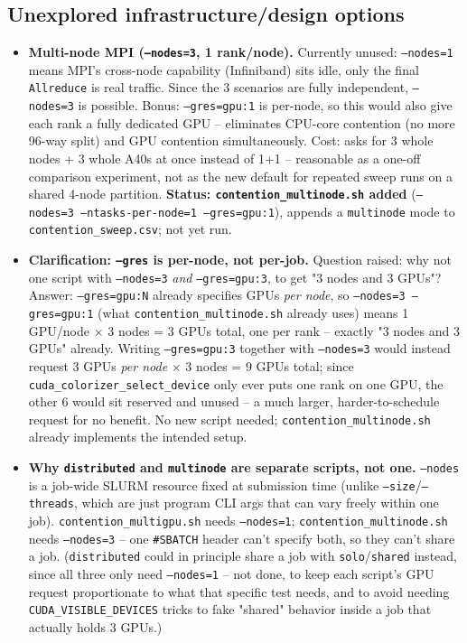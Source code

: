 \subsection{Unexplored infrastructure/design options}
\begin{itemize}
\item \textbf{Multi-node MPI (\texttt{--nodes=3}, 1 rank/node).} Currently unused: \texttt{--nodes=1} means MPI's cross-node capability (Infiniband) sits idle, only the final \texttt{Allreduce} is real traffic. Since the 3 scenarios are fully independent, \texttt{--nodes=3} is possible. Bonus: \texttt{--gres=gpu:1} is per-node, so this would also give each rank a fully dedicated GPU -- eliminates CPU-core contention (no more 96-way split) and GPU contention simultaneously. Cost: asks for 3 whole nodes + 3 whole A40s at once instead of 1+1 -- reasonable as a one-off comparison experiment, not as the new default for repeated sweep runs on a shared 4-node partition. \textbf{Status: \texttt{contention\_multinode.sh} added} (\texttt{--nodes=3 --ntasks-per-node=1 --gres=gpu:1}), appends a \texttt{multinode} mode to \texttt{contention\_sweep.csv}; not yet run.
\item \textbf{Clarification: \texttt{--gres} is per-node, not per-job.} Question raised: why not one script with \texttt{--nodes=3} \emph{and} \texttt{--gres=gpu:3}, to get "3 nodes and 3 GPUs"? Answer: \texttt{--gres=gpu:N} already specifies GPUs \emph{per node}, so \texttt{--nodes=3 --gres=gpu:1} (what \texttt{contention\_multinode.sh} already uses) means 1 GPU/node $\times$ 3 nodes = 3 GPUs total, one per rank -- exactly "3 nodes and 3 GPUs" already. Writing \texttt{--gres=gpu:3} together with \texttt{--nodes=3} would instead request 3 GPUs \emph{per node} $\times$ 3 nodes = 9 GPUs total; since \texttt{cuda\_colorizer\_select\_device} only ever puts one rank on one GPU, the other 6 would sit reserved and unused -- a much larger, harder-to-schedule request for no benefit. No new script needed; \texttt{contention\_multinode.sh} already implements the intended setup.
\item \textbf{Why \texttt{distributed} and \texttt{multinode} are separate scripts, not one.} \texttt{--nodes} is a job-wide SLURM resource fixed at submission time (unlike \texttt{--size}/\texttt{--threads}, which are just program CLI args that can vary freely within one job). \texttt{contention\_multigpu.sh} needs \texttt{--nodes=1}; \texttt{contention\_multinode.sh} needs \texttt{--nodes=3} -- one \texttt{\#SBATCH} header can't specify both, so they can't share a job. (\texttt{distributed} could in principle share a job with \texttt{solo}/\texttt{shared} instead, since all three only need \texttt{--nodes=1} -- not done, to keep each script's GPU request proportionate to what that specific test needs, and to avoid needing \texttt{CUDA\_VISIBLE\_DEVICES} tricks to fake "shared" behavior inside a job that actually holds 3 GPUs.)

\end{itemize}
